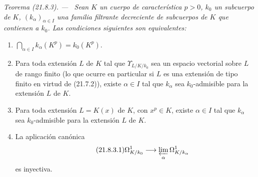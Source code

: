 \documentclass[10pt,oneside]{book}
\makeatletter
\newcommand{\setmanualcurrentlabel}[1]{\def\@currentlabel{#1}}
\newenvironment{theorem}[1][]{%
  \setmanualcurrentlabel{#1}\par\medskip\noindent\itshape Teorema (#1). ---\ }{\par}
\makeatother
\begin{document}
\begin{theorem}[21.8.3]
\label{0.21.8.3-es}
Sean $K$ un cuerpo de característica $p>0$, $k_0$ un subcuerpo de $K$,
$(k_\alpha)_{\alpha\in I}$ una familia filtrante decreciente de subcuerpos
de $K$ que contienen a $k_0$. Las condiciones siguientes son equivalentes:
\begin{enumerate}
  \item[\rm a)] $\bigcap_{\alpha\in I}k_\alpha(K^p)=k_0(K^p)$.
  \item[\rm b)] Para toda extensión $L$ de $K$ tal que
  $\Upsilon_{L/K/k_0}$ sea un espacio vectorial sobre $L$ de rango finito
  \textup{(}lo que ocurre en particular si $L$ es una extensión de tipo finito en
  virtud de \textup{(21.7.2))}, existe $\alpha\in I$ tal que $k_\alpha$ sea
  $k_0$-admisible para la extensión $L$ de $K$.
  \item[\rm b$'$)] Para toda extensión $L=K(x)$ de $K$, con $x^p\in K$,
  existe $\alpha\in I$ tal que $k_\alpha$ sea $k_0$-admisible para
  la extensión $L$ de $K$.
  \item[\rm c)] La aplicación canónica
\begin{equation}
\tag{21.8.3.1}
\label{0.21.8.3.1-es}
\Omega^1_{K/k_0}\longrightarrow\varprojlim_{\alpha}\Omega^1_{K/k_\alpha}
\end{equation}
es inyectiva.
\end{enumerate}
\end{theorem}
\end{document}

